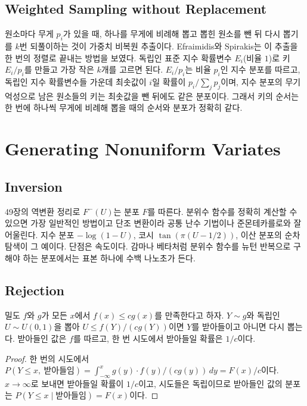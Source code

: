 \subsection{Weighted Sampling without Replacement}

원소마다 무게 $p_i$가 있을 때, 하나를 무게에 비례해 뽑고 뽑힌 원소를 뺀 뒤 다시 뽑기를 $k$번 되풀이하는 것이 가중치 비복원 추출이다. Efraimidis와 Spirakis는 이 추출을 한 번의 정렬로 끝내는 방법을 보였다\cite{efraimidis2006}. 독립인 표준 지수 확률변수 $E_i$(비율 $1$)로 키 $E_i/p_i$를 만들고 가장 작은 $k$개를 고르면 된다. $E_i/p_i$는 비율 $p_i$인 지수 분포를 따르고, 독립인 지수 확률변수들 가운데 최솟값이 $i$일 확률이 $p_i/\sum_jp_j$이며, 지수 분포의 무기억성으로 남은 원소들의 키는 최솟값을 뺀 뒤에도 같은 분포이다. 그래서 키의 순서는 한 번에 하나씩 무게에 비례해 뽑을 때의 순서와 분포가 정확히 같다.

\section{Generating Nonuniform Variates}
\label{sec:variate-generation}

\subsection{Inversion}

49장의 역변환 정리로 $F^{-}(U)$는 분포 $F$를 따른다. 분위수 함수를 정확히 계산할 수 있으면 가장 일반적인 방법이고 단조 변환이라 공통 난수 기법이나 준몬테카를로와 잘 어울린다. 지수 분포 $-\log(1-U)$, 코시 $\tan(\pi(U-1/2))$, 이산 분포의 순차 탐색이 그 예이다. 단점은 속도이다. 감마나 베타처럼 분위수 함수를 뉴턴 반복으로 구해야 하는 분포에서는 표본 하나에 수백 나노초가 든다.

\subsection{Rejection}

\begin{proposition}
\label{prop:rejection}
밀도 $f$와 $g$가 모든 $x$에서 $f(x)\le cg(x)$를 만족한다고 하자. $Y\sim g$와 독립인 $U\sim U(0,1)$을 뽑아 $U\le f(Y)/(cg(Y))$이면 $Y$를 받아들이고 아니면 다시 뽑는다. 받아들인 값은 $f$를 따르고, 한 번 시도에서 받아들일 확률은 $1/c$이다.
\end{proposition}

\begin{proof}
한 번의 시도에서 $P(Y\le x,\ \text{받아들임})=\int_{-\infty}^xg(y)\cdot f(y)/(cg(y))\,dy=F(x)/c$이다. $x\to\infty$로 보내면 받아들일 확률이 $1/c$이고, 시도들은 독립이므로 받아들인 값의 분포는 $P(Y\le x\mid\text{받아들임})=F(x)$이다.
\end{proof}

